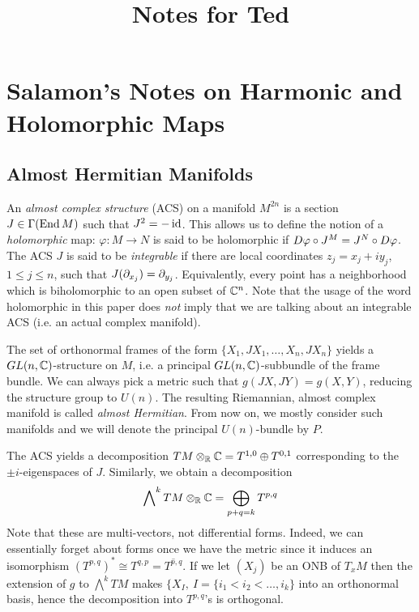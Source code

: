 \documentclass{scrartcl}
\title{Notes for Ted}
\author{}
\date{}
\begin{document}
\section{Salamon's Notes on Harmonic and Holomorphic Maps}

\subsection{Almost Hermitian Manifolds}

An \emph{almost complex structure} (ACS) on a manifold $M^{2n}$ is a section $J\in \Gamma(\operatorname{End} M)$ such that $J^2=-\operatorname{id}$. This allows us to define the notion of a \emph{holomorphic} map: $\varphi:M\to N$ is said to be holomorphic if $D\varphi\circ J^M=J^N\circ D \varphi$. The ACS $J$ is said to be \emph{integrable} if there are local coordinates $z_j=x_j+iy_j$, $1\leq j\leq n$, such that $J(\partial_{x_j})=\partial_{y_j}$. Equivalently, every point has a neighborhood which is biholomorphic to an open subset of $\mathbb{C}^n$. Note that the usage of the word holomorphic in this paper does \emph{not} imply that we are talking about an integrable ACS (i.e. an actual complex manifold). 

\medskip

The set of orthonormal frames of the form $\{X_1,JX_1,\dots,X_n,JX_n\}$ yields a $GL(n,\mathbb{C})$-structure on $M$, i.e. a principal $GL(n,\mathbb{C})$-subbundle of the frame bundle. We can always pick a metric such that $g(JX,JY)=g(X,Y)$, reducing the structure group to $U(n)$. The resulting Riemannian, almost complex manifold is called \emph{almost Hermitian}. From now on, we mostly consider such manifolds and we will denote the principal $U(n)$-bundle by $P$.

\medskip

The ACS yields a decomposition $TM\otimes_{\mathbb{R}} \mathbb{C}=T^{1,0}\oplus T^{0,1}$ corresponding to the $\pm i$-eigenspaces of $J$. Similarly, we obtain a decomposition 
\begin{equation*}
\bigwedge\nolimits^k TM\otimes_{\mathbb{R}} \mathbb{C}=\bigoplus_{p+q=k}T^{p,q}
\end{equation*}
Note that these are multi-vectors, not differential forms. Indeed, we can essentially forget about forms once we have the metric since it induces an isomorphism $(T^{p,q})^*\cong T^{q,p}=\overline{T^{p,q}}$. If we let $(X_j)$ be an ONB of $T_xM$ then the extension of $g$ to $\bigwedge^kTM$ makes $\{X_I,\ I=\{i_1<i_2<\dots,i_k\}$ into an orthonormal basis, hence the decomposition into $T^{p,q}$'s is orthogonal.
\end{document}
